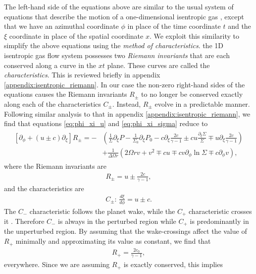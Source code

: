 The left-hand side of the equations above are similar to the usual system of equations that describe the motion of a one-dimensional isentropic gas \citep{landau1959}, except that we have an azimuthal coordinate $\phi$ in place of the time coordinate $t$ and the $\xi$ coordinate in place of the spatial coordinate $x$.
We exploit this similarity to simplify the above equations using the \textit{method of characteristics}.
the 1D isentropic gas flow system possesses two \textit{Riemann invariants} that are each conserved along a curve in the $xt$ plane.
These curves are called the \textit{characteristics}.
This is reviewed briefly in appendix \ref{appendix:isentropic_riemann}.
In our case the non-zero right-hand sides of the equations causes the Riemann invariants $R_\pm$ to no longer be conserved exactly along each of the characteristics $C_\pm$.
Instead, $R_\pm$ evolve in a predictable manner.
Following similar analysis to that in appendix \ref{appendix:isentropic_riemann}, we find that equations \ref{eq:phi_xi_u} and \ref{eq:phi_xi_sigma} reduce to 
\begin{align}
    \begin{split}
        \left[ \partial_\phi + (u \pm c) \partial_\xi \right] R_\pm = - &\left( \frac{1}{\Sigma} \partial_\xi P - \frac{1}{\Sigma_0} \partial_\xi P_0 - c\partial_\xi \frac{2c}{\gamma-1} \pm cu \frac{\partial_\xi \Sigma}{\Sigma} \mp u \partial_\xi \frac{2c}{\gamma-1} \right) \\
        &+ \frac{1}{\Delta \Omega r} \left( 2\Omega r v + v^2 \mp cu \mp cv \partial_\phi \ln \Sigma \mp c \partial_\phi v \right),
    \end{split}
\end{align}
where the Riemann invariants are
\begin{align}
    R_\pm = u \pm \frac{2c}{\gamma-1},
\end{align}
and the characteristics are
\begin{align}
    C_\pm : \, \frac{d\xi}{d\phi} = u \pm c.
\end{align}
The $C_-$ characteristic follows the planet wake, while the $C_+$ characteristic crosses it \citep{goodman2001}.
Therefore $C_-$ is always in the perturbed region while $C_+$ is predominantly in the unperturbed region.
By assuming that the wake-crossings affect the value of $R_+$ minimally and approximating its value as constant, we find that
\begin{align}
    R_+ = \frac{2 c_0}{\gamma - 1},
\end{align}
everywhere.
Since we are assuming $R_+$ is exactly conserved, this implies
